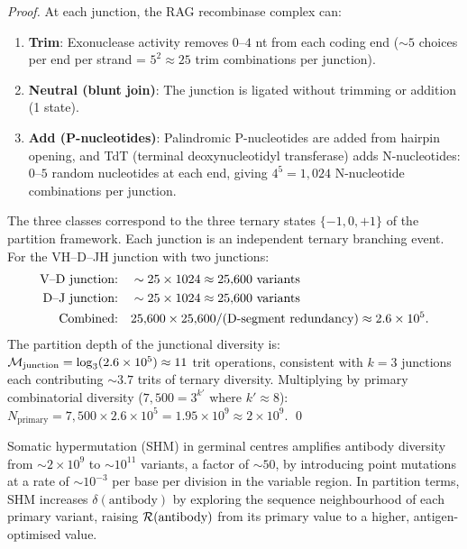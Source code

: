 \begin{proof}
At each junction, the RAG recombinase complex can:
\begin{enumerate}[label=(\roman*)]
  \item \textbf{Trim}: Exonuclease activity removes $0$--$4$ nt from each
        coding end ($\sim 5$ choices per end per strand = $5^2 \approx 25$ trim
        combinations per junction).
  \item \textbf{Neutral (blunt join)}: The junction is ligated without
        trimming or addition (1 state).
  \item \textbf{Add (P-nucleotides)}: Palindromic P-nucleotides are added
        from hairpin opening, and TdT (terminal deoxynucleotidyl transferase)
        adds N-nucleotides: $0$--$5$ random nucleotides at each end, giving
        $4^5 = 1{,}024$ N-nucleotide combinations per junction.
\end{enumerate}
The three classes correspond to the three ternary states
$\{-1, 0, +1\}$ of the partition framework. Each junction is an independent
ternary branching event. For the VH--D--JH junction with two junctions:
\begin{align}
  \text{V--D junction:} & \quad \sim 25 \times 1024 \approx 25{,}600 \text{ variants} \notag \\
  \text{D--J junction:} & \quad \sim 25 \times 1024 \approx 25{,}600 \text{ variants} \notag \\
  \text{Combined:}      & \quad 25{,}600 \times 25{,}600 / (\text{D-segment redundancy})
                               \approx 2.6 \times 10^5. \notag
\end{align}
The partition depth of the junctional diversity is:
$\mathcal{M}_{\mathrm{junction}} = \log_3(2.6 \times 10^5) \approx 11$ trit operations,
consistent with $k = 3$ junctions each contributing $\sim 3.7$ trits
of ternary diversity. Multiplying by primary combinatorial diversity
($7{,}500 = 3^{k'}$ where $k' \approx 8$):
$N_{\mathrm{primary}} = 7{,}500 \times 2.6 \times 10^5 = 1.95 \times 10^9 \approx 2 \times 10^9$. \qed
\end{proof}

\begin{proposition}
\label{prop:shm}
Somatic hypermutation (SHM) in germinal centres amplifies antibody diversity
from $\sim 2 \times 10^9$ to $\sim 10^{11}$ variants, a factor of $\sim 50$,
by introducing point mutations at a rate of $\sim 10^{-3}$ per base per
division in the variable region. In partition terms, SHM increases
$\delta(\text{antibody})$ by exploring the sequence neighbourhood of each
primary variant, raising $\mathcal{R}(\text{antibody})$ from its primary value
to a higher, antigen-optimised value.
\end{proposition}

